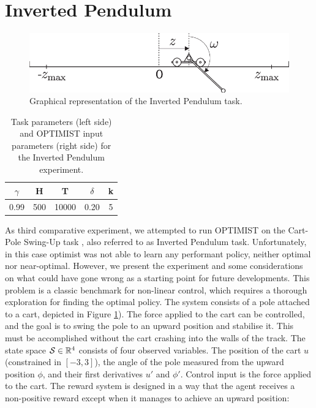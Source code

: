 
\section{Inverted Pendulum}

\begin{figure}[t!] 
\centering
\includegraphics[width=.8\textwidth,keepaspectratio]{Images/inverted_pendulum.png}
\caption{Graphical representation of the Inverted Pendulum task.} 
\label{fig:invpend}
\end{figure} 

\begin{table}
\centering
\begin{tabular}{ccc|cc} 
\toprule
$\gamma$ & H & T & $\delta$ & k\\ 
\midrule
0.99 & 500 & 10000 & 0.20 & 5\\
\bottomrule
\end{tabular}
\caption{Task parameters (left side) and \gls{OPTIMIST} input parameters (right side) for the Inverted Pendulum experiment.}
\label{tab:IPcoeff}
\end{table}

As third comparative experiment, we attempted to run \gls{OPTIMIST} on the Cart-Pole Swing-Up task \cite{tornio2006variational}, also referred to as Inverted Pendulum task. Unfortunately, in this case optimist was not able to learn any performant policy, neither optimal nor near-optimal. However, we present the experiment and some considerations on what could have gone wrong as a starting point for future developments.
This problem is a classic benchmark for non-linear control, which requires a thorough exploration for finding the optimal policy. The system consists of a pole attached to a cart, depicted in Figure \ref{fig:invpend}). The force applied to the cart can be controlled, and the goal is to swing the pole to an  upward  position  and  stabilise  it.  This  must  be accomplished without the cart crashing into the walls of the track. The state space $\mathcal{S}\in\mathbb{R}^4$ consists of four observed variables. The position of the cart $u$ (constrained in $[-3,3]$), the angle  of  the  pole  measured  from  the upward  position $\phi$,  and  their  first  derivatives $u'$ and $\phi'$.  Control input is the force applied to the cart. The reward system is designed in a way that the agent receives a non-positive reward except when it manages to achieve an upward position:


